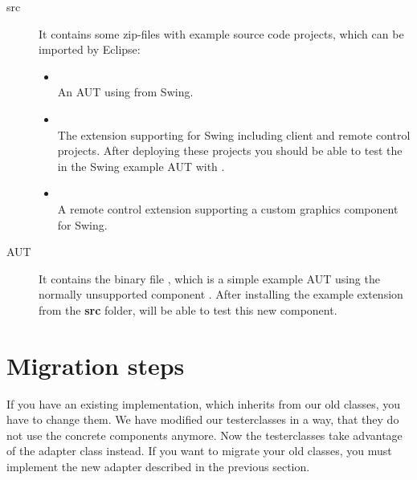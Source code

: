 \begin{description}
 \item[src] It contains some zip-files with example source code projects, which
            can be imported by Eclipse:
 \begin{itemize}
   \item {}\\
         An AUT using  from Swing.
   \item {}\\
         The \app{} extension supporting  for Swing including
         client and remote control projects. After deploying these projects you
         should be able to test the  in the Swing example AUT
         with \app{}.
   \item {}\\
         A \app{} remote control extension supporting a custom graphics
         component for Swing.
 \end{itemize}
 \item[AUT] It contains the binary file , which is a simple
 example AUT using the normally unsupported component . After
 installing the  example extension from the \textbf{src}
 folder, \app{} will be able to test this new component.
\end{description}

\section{Migration steps}
If you have an existing implementation, which inherits from our old classes,
you have to change them. We have modified our testerclasses in a way, that they
do not use the concrete components anymore. Now the testerclasses take
advantage of the adapter class instead. If you want to migrate your old
classes, you must implement the new adapter described in the previous section.

